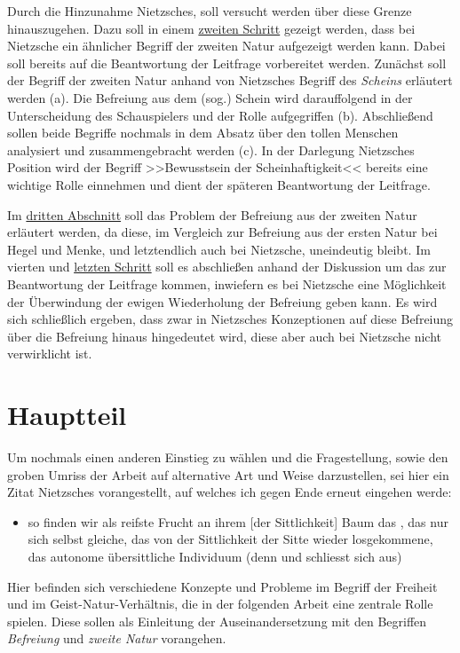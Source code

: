 \documentclass[12pt, a4paper, openany]{report}
\begin{document}
Durch die Hinzunahme Nietzsches, soll versucht werden über diese Grenze hinauszugehen.
Dazu soll in einem \hyperref[abschnitt_2]{zweiten Schritt} gezeigt werden, dass bei Nietzsche ein ähnlicher Begriff der zweiten Natur aufgezeigt werden kann.
Dabei soll bereits auf die Beantwortung der Leitfrage vorbereitet werden.
Zunächst soll der Begriff der zweiten Natur anhand von Nietzsches Begriff des \textit{Scheins} erläutert werden (a).
Die Befreiung aus dem (sog.) Schein wird darauffolgend in der Unterscheidung des Schauspielers und der Rolle aufgegriffen (b). 
Abschließend sollen beide Begriffe nochmals in dem Absatz über den tollen Menschen analysiert und zusammengebracht werden (c).
In der Darlegung Nietzsches Position wird der Begriff >>Bewusstsein der Scheinhaftigkeit<< bereits eine wichtige Rolle einnehmen und dient der späteren Beantwortung der Leitfrage.

Im \hyperref[abschnitt_3]{dritten Abschnitt} soll das Problem der Befreiung aus der zweiten Natur erläutert werden, da diese, im Vergleich zur Befreiung aus der ersten Natur bei Hegel und Menke, und letztendlich auch bei Nietzsche, uneindeutig bleibt.
Im vierten und \hyperref[abschnitt_4]{letzten Schritt} soll es abschließen anhand der Diskussion um das  zur Beantwortung der Leitfrage kommen, inwiefern es bei Nietzsche eine Möglichkeit der Überwindung der ewigen Wiederholung der Befreiung geben kann. 
Es wird sich schließlich ergeben, dass zwar in Nietzsches Konzeptionen auf diese Befreiung über die Befreiung hinaus hingedeutet wird, diese aber auch bei Nietzsche nicht verwirklicht ist.


\chapter{Hauptteil}
Um nochmals einen anderen Einstieg zu wählen und die Fragestellung, sowie den groben Umriss der Arbeit auf alternative Art und Weise darzustellen, sei hier ein Zitat Nietzsches vorangestellt, auf welches ich gegen Ende erneut eingehen werde: 
\begin{itemize}
    \item[] \textelp{} so finden wir als reifste Frucht an ihrem [der Sittlichkeit] Baum das  , das nur sich selbst gleiche, das von der Sittlichkeit der Sitte wieder losgekommene, das autonome übersittliche Individuum (denn  und  schliesst sich aus) \textelp{} 
\end{itemize} 
Hier befinden sich verschiedene Konzepte und Probleme im Begriff der Freiheit und im Geist-Natur-Verhältnis, die in der folgenden Arbeit eine zentrale Rolle spielen. 
Diese sollen als Einleitung der Auseinandersetzung mit den Begriffen \emph{Befreiung} und \emph{zweite Natur} vorangehen.\\
\end{document}
